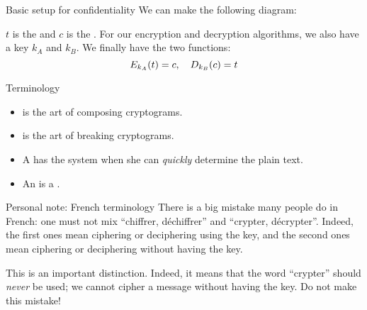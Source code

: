 \documentclass[a4paper]{article}
\begin{document}
\begin{parag}{Basic setup for confidentiality}
    We can make the following diagram:

    $t$ is the  and $c$ is the . For our encryption and decryption algorithms, we also have a key $k_A$ and $k_B$. We finally have the two functions: 
    \[E_{k_A}\left(t\right) = c, \mathspace D_{k_{B}}\left(c\right) = t\]
\end{parag}

\begin{parag}{Terminology}
    \begin{itemize}[left=0pt]
        \item {} is the art of composing cryptograms.
        \item {} is the art of breaking cryptograms.
        \item A  has  the system when she can \textit{quickly} determine the plain text.
        \item An  is a .
    \end{itemize}

    \begin{subparag}{Personal note: French terminology}
        There is a big mistake many people do in French: one must not mix ``chiffrer, déchiffrer'' and ``crypter, décrypter''. Indeed, the first ones mean ciphering or deciphering using the key, and the second ones mean ciphering or deciphering without having the key. 

        This is an important distinction. Indeed, it means that the word ``crypter'' should \textit{never} be used; we cannot cipher a message without having the key. Do not make this mistake!
    \end{subparag}
    
\end{parag}
\end{document}
